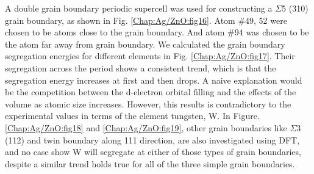 A double grain boundary periodic supercell was used for constructing a $\Sigma$5 (310) grain boundary, as shown in Fig. \ref{Chap:Ag/ZnO:fig16}. Atom \#49, 52 were chosen to be atoms close to the grain boundary. And atom \#94 was chosen to be the atom far away from grain boundary. We calculated the grain boundary segregation energies for different elements in Fig. \ref{Chap:Ag/ZnO:fig17}. Their segregation across the period shows a consistent trend, which is that the segregation energy increases at first and then drops. A naive explanation would be the competition between the d-electron orbital filling and the effects of the volume as atomic size increases. However, this results is contradictory to the experimental values in terms of the element tungsten, W. \cite{chookajorn2012design,jiao2018nanocrystalline} In Figure. \ref{Chap:Ag/ZnO:fig18} and \ref{Chap:Ag/ZnO:fig19}, other grain boundaries like $\Sigma$3 (112) and twin boundary along {111} direction, are also investigated using \ac{DFT}, and no case show W will segregate at either of those types of grain boundaries, despite a similar trend holds true for all of the three simple grain boundaries.

